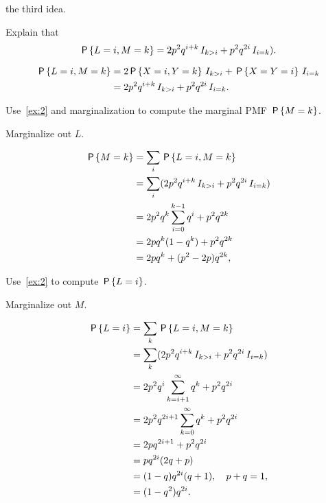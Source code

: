  the third idea.

\begin{exercise}\label{ex:2}
Explain that
\begin{equation*}
\P{L=i, M=k} = 2p^{2}q^{i+k}\1{k>i}+ p^{2}q^{2i}\1{i=k}).
\end{equation*}
\begin{solution}
  \begin{align*}
\P{L=i, M=k}
&= 2\P{X=i, Y=k}\1{k>i} + \P{X=Y=i}\1{i=k} \\
&= 2p^{2}q^{i+k}\1{k>i}+ p^{2}q^{2i}\1{i=k}.
  \end{align*}
\end{solution}
\end{exercise}


\begin{exercise}
Use~\cref{ex:2} and marginalization to compute the marginal PMF $\P{M=k}$.
\begin{hint}
Marginalize out $L$.
\end{hint}
\begin{solution}
  \begin{align*}
\P{M=k}
&= \sum_{i} \P{L=i, M=k} \\
 &= \sum_{i} (2p^{2}q^{i+k}\1{k>i}+ p^{2}q^{2i}\1{i=k}) \\
 &= 2p^2q^k\sum_{i=0}^{k-1} q^{i}+ p^{2}q^{2k} \\
 &= 2pq^k (1-q^{k})+ p^{2}q^{2k} \\
 &= 2pq^k + (p^{2}-2p) q^{2k},
  \end{align*}
\end{solution}
\end{exercise}

\begin{exercise}
Use~\cref{ex:2} to compute $\P{L=i}$.
\begin{hint}
Marginalize out $M$.
\end{hint}
\begin{solution}
  \begin{align*}
\P{L=i}
&= \sum_{k} \P{L=i, M=k} \\
 &= \sum_{k} (2p^{2}q^{i+k}\1{k>i}+ p^{2}q^{2i}\1{i=k}) \\
 &= 2p^2q^i\sum_{k=i+1}^{\infty} q^{k}+ p^{2}q^{2i} \\
 &= 2p^{2}q^{2i+1} \sum_{k=0}^{\infty}q^{k}+ p^{2}q^{2i} \\
 &= 2pq^{2i+1} + p^{2} q^{2i}\\
 &= pq^{2i}(2q+p)\\
 &= (1-q)q^{2i}(q + 1), \quad p+q=1,\\
 &= (1-q^{2})q^{2i}.
  \end{align*}
\end{solution}
\end{exercise}

